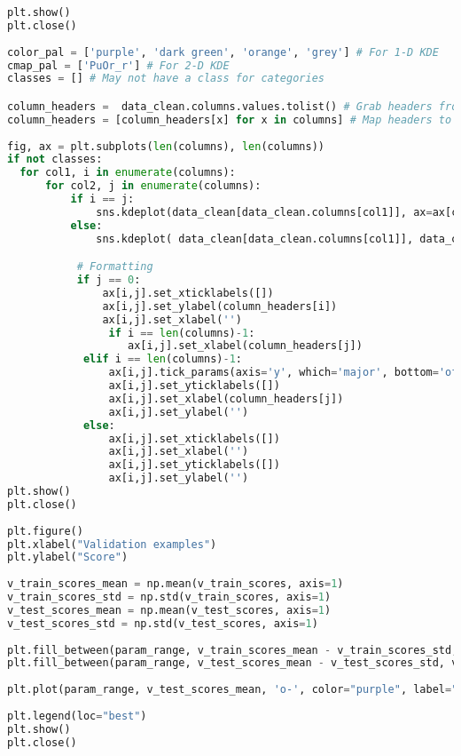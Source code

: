 \begin{lstlisting}[language=python]
plt.show()
plt.close()
 
color_pal = ['purple', 'dark green', 'orange', 'grey'] # For 1-D KDE
cmap_pal = ['PuOr_r'] # For 2-D KDE
classes = [] # May not have a class for categories

column_headers =  data_clean.columns.values.tolist() # Grab headers from df
column_headers = [column_headers[x] for x in columns] # Map headers to indices selected
 
fig, ax = plt.subplots(len(columns), len(columns))
if not classes:
  for col1, i in enumerate(columns):
      for col2, j in enumerate(columns):
          if i == j:
              sns.kdeplot(data_clean[data_clean.columns[col1]], ax=ax[col1][col2], color=color_pal[0], shade=True, legend=False)
          else:
              sns.kdeplot( data_clean[data_clean.columns[col1]], data_clean[data_clean.columns[col2]], ax=ax[col1][col2], cmap=cmap_pal[0])

           # Formatting
           if j == 0:
               ax[i,j].set_xticklabels([])
               ax[i,j].set_ylabel(column_headers[i])
               ax[i,j].set_xlabel('')
                if i == len(columns)-1:
                   ax[i,j].set_xlabel(column_headers[j])
            elif i == len(columns)-1:
                ax[i,j].tick_params(axis='y', which='major', bottom='off')
                ax[i,j].set_yticklabels([])
                ax[i,j].set_xlabel(column_headers[j])
                ax[i,j].set_ylabel('')            
            else:
                ax[i,j].set_xticklabels([])
                ax[i,j].set_xlabel('')            
                ax[i,j].set_yticklabels([])
                ax[i,j].set_ylabel('')
plt.show()
plt.close()
 
plt.figure()
plt.xlabel("Validation examples")
plt.ylabel("Score")
 
v_train_scores_mean = np.mean(v_train_scores, axis=1)
v_train_scores_std = np.std(v_train_scores, axis=1)
v_test_scores_mean = np.mean(v_test_scores, axis=1)
v_test_scores_std = np.std(v_test_scores, axis=1)
 
plt.fill_between(param_range, v_train_scores_mean - v_train_scores_std, v_train_scores_mean + v_train_scores_std, alpha=0.1, color="orange")
plt.fill_between(param_range, v_test_scores_mean - v_test_scores_std, v_test_scores_mean + v_test_scores_std, alpha=0.1, color="purple")plt.plot(param_range, v_train_scores_mean, 'o-', color="orange", label="Training score")
 
plt.plot(param_range, v_test_scores_mean, 'o-', color="purple", label="Cross-validation score")
 
plt.legend(loc="best")
plt.show()
plt.close()
\end{lstlisting}